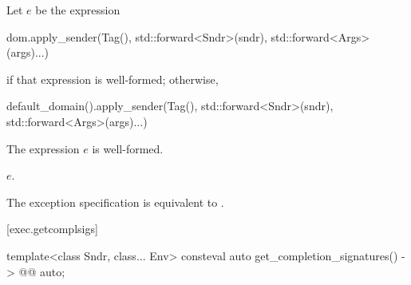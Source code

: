 \begin{itemdescr}
\pnum
Let $e$ be the expression
\begin{codeblock}
dom.apply_sender(Tag(), std::forward<Sndr>(sndr), std::forward<Args>(args)...)
\end{codeblock}
if that expression is well-formed; otherwise,
\begin{codeblock}
default_domain().apply_sender(Tag(), std::forward<Sndr>(sndr), std::forward<Args>(args)...)
\end{codeblock}

\pnum
\constraints
The expression $e$ is well-formed.

\pnum
\returns
$e$.

\pnum
\remarks
The exception specification is equivalent to .
\end{itemdescr}

[exec.getcomplsigs]{}

%
\begin{itemdecl}
template<class Sndr, class... Env>
  consteval auto get_completion_signatures() -> @@ auto;
\end{itemdecl}

